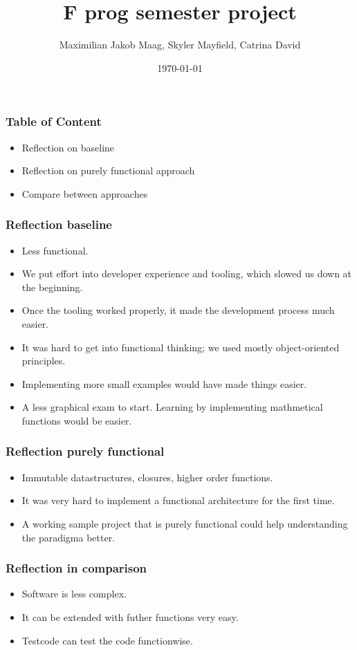 \documentclass{beamer}
\title{F prog semester project}
\author{Maximilian Jakob Maag, Skyler Mayfield, Catrina David}
\date{\today}
\begin{document}
	\begin{frame}
		\titlepage
	\end{frame}
	\begin{frame}
		\frametitle{Table of Content}
		\begin{itemize}
			\item Reflection on baseline
			\item Reflection on purely functional approach
			\item Compare between approaches
		\end{itemize}
	\end{frame}
	\begin{frame}
		\frametitle{Reflection baseline}
		\begin{itemize}
            \item Less functional.
            \item We put effort into developer experience and tooling, which slowed us down at the beginning.
            \item Once the tooling worked properly, it made the development process much easier.
            \item It was hard to get into functional thinking; we used mostly object-oriented principles.
            \item Implementing more small examples would have made things easier.
			\item A less graphical exam to start. Learning by implementing mathmetical functions would be easier.
		\end{itemize}
	\end{frame}
	\begin{frame}
		\frametitle{Reflection purely functional}
		\begin{itemize}
			\item Immutable datastructures, closures, higher order functions.
			\item It was very hard to implement a functional architecture for the first time.
			\item A working sample project that is purely functional could help understanding the paradigma better.
		\end{itemize}
	\end{frame}
	\begin{frame}
		\frametitle{Reflection in comparison}
		\begin{itemize}
			\item Software is less complex.
			\item It can be extended with futher functions very easy.
			\item Testcode can test the code functionwise.
		\end{itemize}
	\end{frame}
\end{document}
